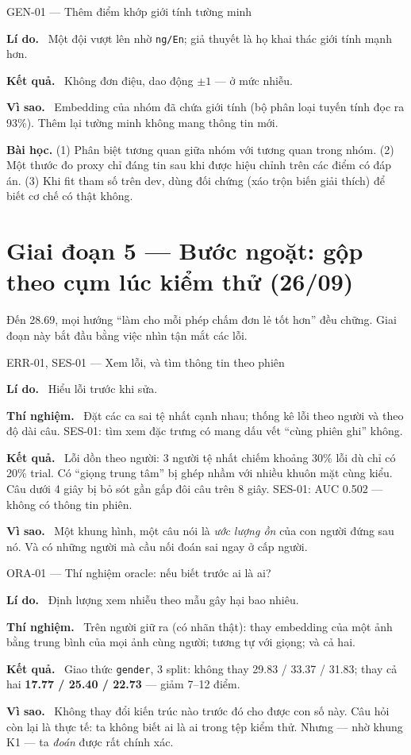 \documentclass[11pt,a4paper,oneside]{report}
\newcommand{\up}[1]{\textbf{\color{good}#1}}
\newcommand{\id}[1]{\texttt{#1}}
\newcommand{\field}[1]{\par\smallskip\textbf{\color{accent}#1.}~}
\begin{document}
\begin{expbox}{GEN-01 --- Thêm điểm khớp giới tính tường minh}
\field{Lí do} Một đội vượt lên nhờ \id{ng/En}; giả thuyết là họ khai thác giới tính mạnh hơn.
\field{Kết quả} Không đơn điệu, dao động $\pm1$ --- ở mức nhiễu.
\field{Vì sao} Embedding của nhóm đã chứa giới tính (bộ phân loại tuyến tính đọc ra 93\%). Thêm lại tường minh không mang thông tin mới.
\end{expbox}

\begin{lesson}
\textbf{Bài học.} (1) Phân biệt tương quan giữa nhóm với tương quan trong nhóm. (2) Một thước đo proxy chỉ đáng tin sau khi được hiệu chỉnh trên các điểm có đáp án. (3) Khi fit tham số trên dev, dùng đối chứng (xáo trộn biến giải thích) để biết cơ chế có thật không.
\end{lesson}

\section{Giai đoạn 5 --- Bước ngoặt: gộp theo cụm lúc kiểm thử (26/09)}
\label{sec:p5}

Đến 28.69, mọi hướng ``làm cho mỗi phép chấm đơn lẻ tốt hơn'' đều chững. Giai đoạn này bắt đầu bằng việc nhìn tận mắt các lỗi.

\begin{expbox}{ERR-01, SES-01 --- Xem lỗi, và tìm thông tin theo phiên}
\field{Lí do} Hiểu lỗi trước khi sửa.
\field{Thí nghiệm} Đặt các ca sai tệ nhất cạnh nhau; thống kê lỗi theo người và theo độ dài câu. SES-01: tìm xem đặc trưng có mang dấu vết ``cùng phiên ghi'' không.
\field{Kết quả} Lỗi dồn theo người: 3 người tệ nhất chiếm khoảng 30\% lỗi dù chỉ có 20\% trial. Có ``giọng trung tâm'' bị ghép nhầm với nhiều khuôn mặt cùng kiểu. Câu dưới 4 giây bị bỏ sót gần gấp đôi câu trên 8 giây. SES-01: AUC 0.502 --- không có thông tin phiên.
\field{Vì sao} Một khung hình, một câu nói là \emph{ước lượng ồn} của con người đứng sau nó. Và có những người mà cầu nối đoán sai ngay ở cấp người.
\end{expbox}

\begin{expbox}{ORA-01 --- Thí nghiệm oracle: nếu biết trước ai là ai?}
\field{Lí do} Định lượng xem nhiễu theo mẫu gây hại bao nhiêu.
\field{Thí nghiệm} Trên người giữ ra (có nhãn thật): thay embedding của một ảnh bằng trung bình của mọi ảnh cùng người; tương tự với giọng; và cả hai.
\field{Kết quả} Giao thức \id{gender}, 3 split: không thay 29.83 / 33.37 / 31.83; thay cả hai \up{17.77 / 25.40 / 22.73} --- giảm 7--12 điểm.
\field{Vì sao} Không thay đổi kiến trúc nào trước đó cho được con số này. Câu hỏi còn lại là thực tế: ta không biết ai là ai trong tệp kiểm thử. Nhưng --- nhờ khung K1 --- ta \emph{đoán} được rất chính xác.
\end{expbox}
\end{document}

